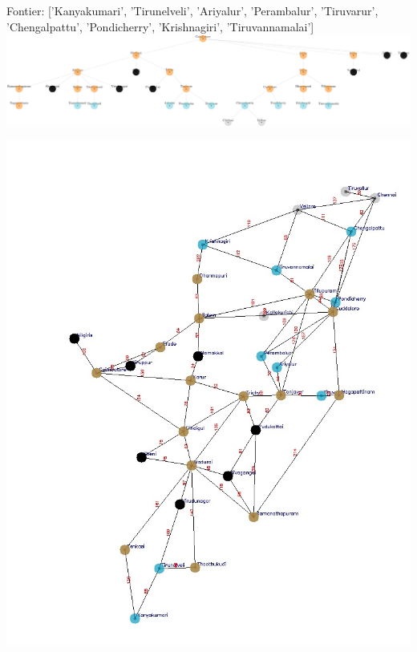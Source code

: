 \documentclass[xcolor=table]{beamer}
\begin{document}
\begin{frame}
  { \tiny Fontier: ['Kanyakumari', 'Tirunelveli', 'Ariyalur', 'Perambalur', 'Tiruvarur', 'Chengalpattu', 'Pondicherry', 'Krishnagiri', 'Tiruvannamalai']}
  \includegraphics[width=1\textwidth]{../BFSNodes/31-1.png}
  \begin{center}
    \includegraphics[height=0.55\textheight]{../BFSoutput/tamilBFS29.jpg}
  \end{center}
\end{frame}
\end{document}
